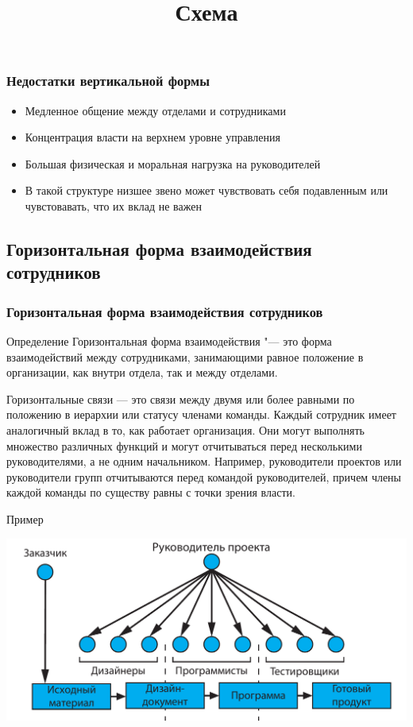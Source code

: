 \documentclass{../industrial-development}
\begin{document}
\begin{frame} \frametitle{Недостатки вертикальной формы}
  
  \begin{itemize}
  \item Медленное общение между отделами и сотрудниками
  \item Концентрация власти на верхнем уровне управления
  \item Большая физическая и моральная нагрузка на руководителей
  \item В такой структуре низшее звено может чувствовать себя подавленным или чувстовавать, что их вклад не важен
  \end{itemize}
\end{frame}

\subsection{Горизонтальная форма взаимодействия сотрудников}

\begin{frame} \frametitle{Горизонтальная форма взаимодействия сотрудников}
  \begin{block}{Определение}
Горизонтальная форма взаимодействия "--- это форма взаимодействий между сотрудниками, занимающими равное положение в организации, как внутри отдела, так и между отделами.
  \end{block}
\end{frame}

\lecturenotes
Горизонтальные связи — это связи между двумя или более равными по положению в иерархии или статусу членами команды. Каждый сотрудник имеет аналогичный вклад в то, как работает организация. Они могут выполнять множество различных функций и могут отчитываться перед несколькими руководителями, а не одним начальником. Например, руководители проектов или руководители групп отчитываются перед командой руководителей, причем члены каждой команды по существу равны с точки зрения власти.

\begin{frame} \title{Схема}
  \begin{block}{Пример}
\centerline{\includegraphics[width=1\textwidth]{horizontal.pdf}}
  \end{block}
\end{frame}
\end{document}
